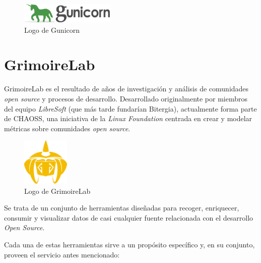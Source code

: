 \begin{figure}[ht]
    \centering
    \includegraphics[width=0.4\textwidth]{Figures/gunicorn-logo}
    \decoRule
    \caption[Gunicorn (Logo)]{Logo de Gunicorn \emph{\parencite{Reference10}}}
    \label{fig:gunicorn-logo}
\end{figure}


\section{GrimoireLab}

GrimoireLab es el resultado de años de investigación y análisis de comunidades \emph{open source} y procesos de desarrollo. Desarrollado originalmente por miembros del equipo \emph{LibreSoft} (que más tarde fundarían Bitergia), actualmente forma parte de CHAOSS, una iniciativa de la \emph{Linux Foundation} centrada en crear y modelar métricas sobre comunidades \emph{open source}. \emph{\parencite{Reference12}}

\begin{figure}[ht]
    \centering
    \includegraphics[width=0.2\textwidth]{Figures/grimoirelab-logo}
    \decoRule
    \caption[GrimoireLab (Logo)]{Logo de GrimoireLab \emph{\parencite{Reference12}}}
    \label{fig:grimoirelab-logo}
\end{figure}

Se trata de un conjunto de herramientas diseñadas para recoger, enriquecer, consumir y visualizar datos de casi cualquier fuente relacionada con el desarrollo \emph{Open Source}.

Cada una de estas herramientas sirve a un propósito específico y, en su conjunto, proveen el servicio antes mencionado:

